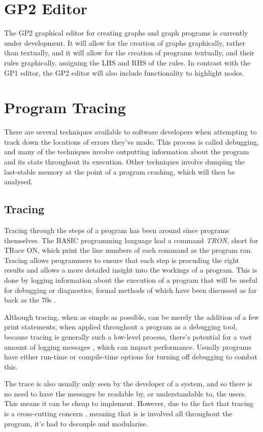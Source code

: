 \documentclass{UoYCSproject}
\begin{document}
\section{GP2 Editor}
The GP2 graphical editor for creating graphs and graph programs is currently under development. It will allow for the creation of graphs graphically, rather than textually, and it will allow for the creation of programs textually, and their rules graphically, assigning the LHS and RHS of the rules. In contrast with the GP1 editor, the GP2 editor will also include functionality to highlight nodes. 

\section{Program Tracing}
There are several techniques available to software developers when attempting to track down the locations of errors they've made. This process is called debugging, and many of the techniques involve outputting information about the program and its state throughout its execution. Other techniques involve dumping the last-stable memory at the point of a program crashing, which will then be analysed. 

\subsection{Tracing}
Tracing through the steps of a program has been around since programs themselves. The BASIC programming language had a command \emph{TRON}, short for TRace ON, which print the line numbers of each command as the program ran. 
Tracing allows programmers to ensure that each step is procuding the right results and allows a more detailed insight into the workings of a program. This is done by logging information about the execution of a program that will be useful for debugging or diagnostics, formal methods of which have been discussed as far back as the 70s \cite{psych_debug, code_walkthroughs}.

Although tracing, when as simple as possible, can be merely the addition of a few print statements, when applied throughout a program as a debugging tool, because tracing is generally such a low-level process, there's potential for a vast amount of logging messages \cite{}, which can impact performance. Usually programs have either run-time or compile-time options for turning off debugging to combat this. 

The trace is also usually only seen by the developer of a system, and so there is no need to have the messages be readable by, or understandable to, the users. This means it can be cheap to implement. However, due to the fact that tracing is a cross-cutting concern \cite{}, meaning that is is involved all throughout the program, it's had to decouple and modularise.
\end{document}
